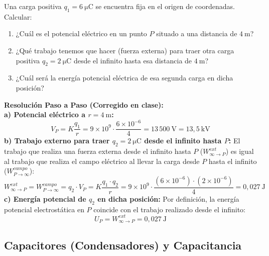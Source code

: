 \begin{ejercicio}
Una carga positiva $q_1 = 6\ \si{\micro\coulomb}$ se encuentra fija en el origen de coordenadas. Calcular:
\begin{enumerate}[label=\alph*)]
    \item ¿Cuál es el potencial eléctrico en un punto $P$ situado a una distancia de $4\ \si{\meter}$?
    \item ¿Qué trabajo tenemos que hacer (fuerza externa) para traer otra carga positiva $q_2 = 2\ \si{\micro\coulomb}$ desde el infinito hasta esa distancia de $4\ \si{\meter}$?
    \item ¿Cuál será la energía potencial eléctrica de esa segunda carga en dicha posición?
\end{enumerate}
\tcbline
\textbf{Resolución Paso a Paso (Corregido en clase):}\\[4pt]
\textbf{a) Potencial eléctrico a $r = 4\ \si{\meter}$:}
\begin{equation}
    V_P = K \frac{q_1}{r} = 9 \times 10^9 \cdot \frac{6 \times 10^{-6}}{4} = 13\,500\ \si{\volt} = 13{,}5\ \si{\kilo\volt}
\end{equation}
\textbf{b) Trabajo externo para traer $q_2 = 2\ \si{\micro\coulomb}$ desde el infinito hasta $P$:}
El trabajo que realiza una fuerza externa desde el infinito hasta $P$ ($W_{\infty \to P}^{ext}$) es igual al trabajo que realiza el campo eléctrico al llevar la carga desde $P$ hasta el infinito ($W_{P \to \infty}^{campo}$):
\begin{equation}
    W_{\infty \to P}^{ext} = W_{P \to \infty}^{campo} = q_2 \cdot V_P = K \frac{q_1 \cdot q_2}{r} = 9 \times 10^9 \cdot \frac{(6 \times 10^{-6}) \cdot (2 \times 10^{-6})}{4} = 0{,}027\ \si{\joule}
\end{equation}
\textbf{c) Energía potencial de $q_2$ en dicha posición:}
Por definición, la energía potencial electrostática en $P$ coincide con el trabajo realizado desde el infinito:
\begin{equation}
    U_P = W_{\infty \to P}^{ext} = 0{,}027\ \si{\joule}
\end{equation}
\end{ejercicio}

\subsection{Capacitores (Condensadores) y Capacitancia}

